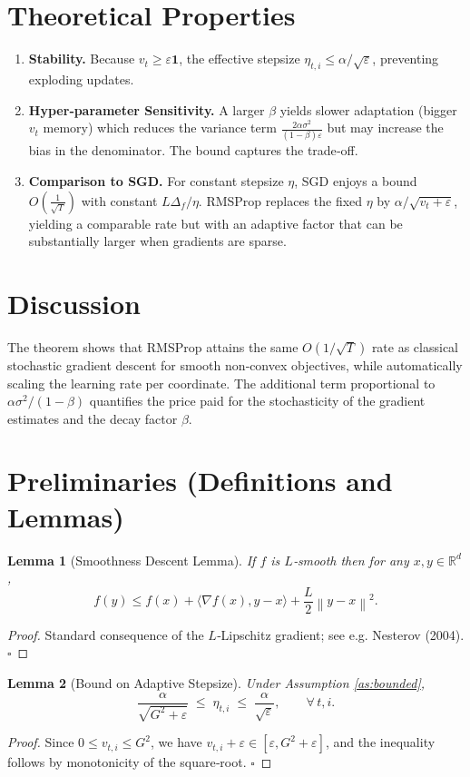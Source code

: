 \documentclass{article}
\newtheorem{lemma}{Lemma}
\newcommand{\R}{\mathbb{R}}
\newcommand{\norm}[1]{\left\lVert #1\right\rVert}
\begin{document}
\section*{Theoretical Properties}
\begin{enumerate}[noitemsep,topsep=0pt]
\item \textbf{Stability.} Because $v_t\ge\varepsilon\mathbf 1$, the effective stepsize
$\eta_{t,i}\le \alpha/\sqrt{\varepsilon}$, preventing exploding updates.
\item \textbf{Hyper‑parameter Sensitivity.} A larger $\beta$ yields slower adaptation
(bigger $v_t$ memory) which reduces the variance term $\frac{2\alpha\sigma^2}{(1-\beta)\varepsilon}$
but may increase the bias in the denominator. The bound captures the trade‑off.
\item \textbf{Comparison to SGD.} For constant stepsize $\eta$, SGD enjoys a bound
$O(\frac{1}{\sqrt{T}})$ with constant $L\Delta_f/\eta$. RMSProp replaces the fixed $\eta$ by
$\alpha/\sqrt{v_t+\varepsilon}$, yielding a comparable rate but with an adaptive factor
that can be substantially larger when gradients are sparse.
\end{enumerate}

\section*{Discussion}
The theorem shows that RMSProp attains the same $O(1/\sqrt{T})$ rate as classical
stochastic gradient descent for smooth non‑convex objectives, while automatically
scaling the learning rate per coordinate. The additional term proportional to
$\alpha\sigma^2/(1-\beta)$ quantifies the price paid for the stochasticity of the
gradient estimates and the decay factor $\beta$.

\newpage
\section*{Preliminaries (Definitions and Lemmas)}
\begin{lemma}[Smoothness Descent Lemma]\label{lem:smooth}
If $f$ is $L$‑smooth then for any $x,y\in\R^d$,
\[
f(y)\le f(x)+\langle\nabla f(x),y-x\rangle+\frac{L}{2}\norm{y-x}^2 .
\]
\end{lemma}
\begin{proof}
Standard consequence of the $L$‑Lipschitz gradient; see e.g. Nesterov (2004). $\square$
\end{proof}

\begin{lemma}[Bound on Adaptive Stepsize]\label{lem:stepsize}
Under Assumption \ref{as:bounded},
\[
\frac{\alpha}{\sqrt{G^2+\varepsilon}}\;\le\;
\eta_{t,i}
\;\le\;
\frac{\alpha}{\sqrt{\varepsilon}},\qquad\forall\,t,i .
\]
\end{lemma}
\begin{proof}
Since $0\le v_{t,i}\le G^2$, we have $v_{t,i}+\varepsilon\in[\varepsilon,G^2+\varepsilon]$,
and the inequality follows by monotonicity of the square‑root. $\square$
\end{proof}
\end{document}
